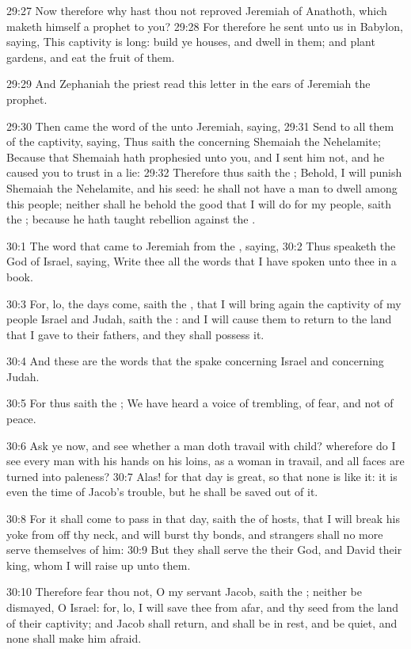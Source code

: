 29:27 Now therefore why hast thou not reproved Jeremiah of Anathoth, which maketh himself a prophet to you?  29:28 For therefore he sent unto us in Babylon, saying, This captivity is long: build ye houses, and dwell in them; and plant gardens, and eat the fruit of them.

29:29 And Zephaniah the priest read this letter in the ears of Jeremiah the prophet.

29:30 Then came the word of the \LORD unto Jeremiah, saying, 29:31 Send to all them of the captivity, saying, Thus saith the \LORD concerning Shemaiah the Nehelamite; Because that Shemaiah hath prophesied unto you, and I sent him not, and he caused you to trust in a lie: 29:32 Therefore thus saith the \LORD; Behold, I will punish Shemaiah the Nehelamite, and his seed: he shall not have a man to dwell among this people; neither shall he behold the good that I will do for my people, saith the \LORD; because he hath taught rebellion against the \LORD.

30:1 The word that came to Jeremiah from the \LORD, saying, 30:2 Thus speaketh the \LORD God of Israel, saying, Write thee all the words that I have spoken unto thee in a book.

30:3 For, lo, the days come, saith the \LORD, that I will bring again the captivity of my people Israel and Judah, saith the \LORD: and I will cause them to return to the land that I gave to their fathers, and they shall possess it.

30:4 And these are the words that the \LORD spake concerning Israel and concerning Judah.

30:5 For thus saith the \LORD; We have heard a voice of trembling, of fear, and not of peace.

30:6 Ask ye now, and see whether a man doth travail with child?  wherefore do I see every man with his hands on his loins, as a woman in travail, and all faces are turned into paleness?  30:7 Alas! for that day is great, so that none is like it: it is even the time of Jacob's trouble, but he shall be saved out of it.

30:8 For it shall come to pass in that day, saith the \LORD of hosts, that I will break his yoke from off thy neck, and will burst thy bonds, and strangers shall no more serve themselves of him: 30:9 But they shall serve the \LORD their God, and David their king, whom I will raise up unto them.

30:10 Therefore fear thou not, O my servant Jacob, saith the \LORD; neither be dismayed, O Israel: for, lo, I will save thee from afar, and thy seed from the land of their captivity; and Jacob shall return, and shall be in rest, and be quiet, and none shall make him afraid.

